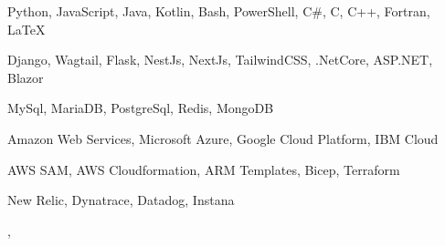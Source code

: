
\begin{cvskills}
  \cvskill
  {
  }
  {
    Python,
    JavaScript,
    Java,
    Kotlin,
    Bash,
    PowerShell,
    C\#,
    C,
    C++,
    Fortran,
    LaTeX
  }

  \cvskill
  {
  }
  {
    Django,
    Wagtail,
    Flask,
    NestJs,
    NextJs,
    TailwindCSS,
    .NetCore,
    ASP.NET,
    Blazor
  }

  \cvskill
  {
  }
  {
    MySql, MariaDB,
    PostgreSql, Redis,
    MongoDB
  }

  \cvskill
  {
  }
  {
    Amazon Web Services,
    Microsoft Azure,
    Google Cloud Platform,
    IBM Cloud
  }

  \cvskill
  {
  }
  {
    AWS SAM,
    AWS Cloudformation,
    ARM Templates,
    Bicep,
    Terraform
  }

  \cvskill
  {
  }
  {
    New Relic,
    Dynatrace,
    Datadog,
    Instana
  }

  \cvskill
  {
  }
  {
    ,
  }

\end{cvskills}
